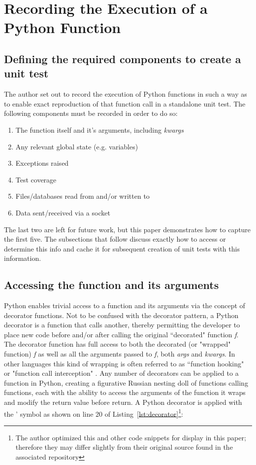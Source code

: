 \section{Recording the Execution of a Python Function}\label{sec:approach}

\subsection{Defining the required components to create a unit test}\label{sec:intro-1}

The author set out to record the execution of Python functions
in such a way as to enable exact reproduction of that 
function call in a standalone unit test.  The following components
must be recorded in order to do so:
\begin{enumerate}
  \item The function itself and it's arguments, including \textit{kwargs}
  \item Any relevant global state (e.g. variables)
  \item Exceptions raised
  \item Test coverage
  \item Files/databases read from and/or written to
  \item Data sent/received via a socket
\end{enumerate}

The last two are left for future work, but this paper demonstrates how to capture 
the first five. The subsections that follow discuss exactly how to 
access or determine this info and cache it for subsequent creation of unit tests
with this information.
\subsection{Accessing the function and its arguments}\label{sec:approach-internal-1}

Python enables trivial access to a function and 
its arguments via the concept of decorator functions. Not to be confused with 
the decorator pattern, a Python decorator is a 
function that calls another, thereby permitting the developer to place new code 
before and/or after calling the original “decorated" function \textit{f}.  
The decorator function has full access to both the decorated 
(or "wrapped" function) \textit{f} as well as all the 
arguments passed to \textit{f}, both \textit{args} and \textit{kwargs}.  In other 
languages this kind of wrapping is often referred to as 
“function hooking" or "function call interception" 
 \cite{kang2018function}. Any number of decorators can be applied to a function 
in Python, creating a figurative Russian nesting doll of
functions calling functions, each with the ability to access the 
arguments of the function it wraps and modify the 
return value before return. A Python decorator is applied with the \lq@\rq 
symbol as shown on line 20 of Listing~\ref{lst:decorator}\footnote{The author optimized this and other code snippets for display in 
this paper; therefore they may differ slightly from their original 
source found in the associated repository}:

